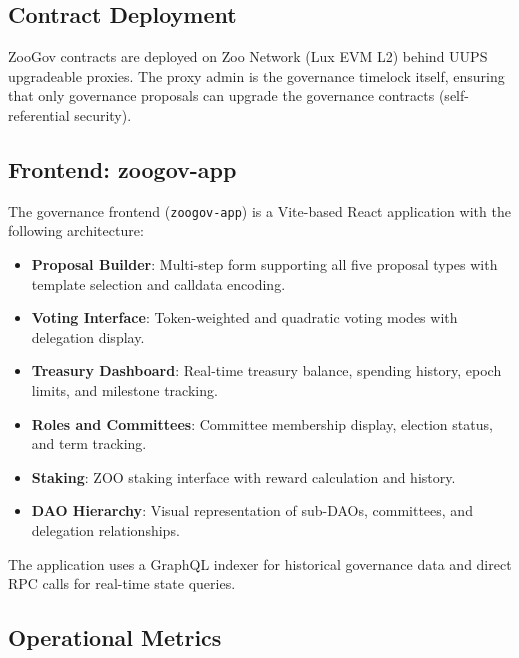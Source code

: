 \documentclass[11pt,letterpaper]{article}
\begin{document}
\subsection{Contract Deployment}

ZooGov contracts are deployed on Zoo Network (Lux EVM L2) behind UUPS upgradeable proxies. The proxy admin is the governance timelock itself, ensuring that only governance proposals can upgrade the governance contracts (self-referential security).

\subsection{Frontend: zoogov-app}

The governance frontend (\texttt{zoogov-app}) is a Vite-based React application with the following architecture:

\begin{itemize}
    \item \textbf{Proposal Builder}: Multi-step form supporting all five proposal types with template selection and calldata encoding.
    \item \textbf{Voting Interface}: Token-weighted and quadratic voting modes with delegation display.
    \item \textbf{Treasury Dashboard}: Real-time treasury balance, spending history, epoch limits, and milestone tracking.
    \item \textbf{Roles and Committees}: Committee membership display, election status, and term tracking.
    \item \textbf{Staking}: ZOO staking interface with reward calculation and history.
    \item \textbf{DAO Hierarchy}: Visual representation of sub-DAOs, committees, and delegation relationships.
\end{itemize}

The application uses a GraphQL indexer for historical governance data and direct RPC calls for real-time state queries.

\subsection{Operational Metrics}
\end{document}
